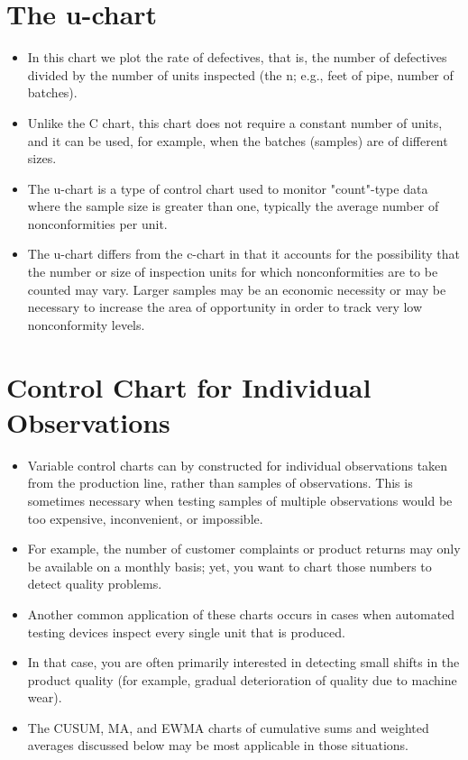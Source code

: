 \documentclass[a4paper,12pt]{article}
\begin{document}
\section{The u-chart}
\begin{itemize}
\item In this chart we plot the rate of defectives, that is, the number of defectives divided by the number of units inspected (the n; e.g., feet of pipe, number of batches). 
\item Unlike the C chart, this chart does not require a constant number of units, and it can be used, for example, when the batches (samples) are of different sizes.

\item The u-chart is a type of control chart used to monitor "count"-type data where the sample size is greater than one, typically the average number of nonconformities per unit.

\item The u-chart differs from the c-chart in that it accounts for the possibility that the number or size of inspection units for which nonconformities are to be counted may vary. Larger samples may be an economic necessity or may be necessary to increase the area of opportunity in order to track very low nonconformity levels.
\end{itemize}
\newpage
\section{Control Chart for Individual Observations}

\begin{itemize}
\item Variable control charts can by constructed for individual observations taken from the production line, rather than samples of observations. This is sometimes necessary when testing samples of multiple observations would be too expensive, inconvenient, or impossible. \item For example, the number of customer complaints or product returns may only be available on a monthly basis; yet, you want to chart those numbers to detect quality problems. \item Another common application of these charts occurs in cases when automated testing devices inspect every single unit that is produced. \item In that case, you are often primarily interested in detecting small shifts in the product quality (for example, gradual deterioration of quality due to machine wear). 
\item The CUSUM, MA, and EWMA charts of cumulative sums and weighted averages discussed below may be most applicable in those situations.
\end{itemize}
\end{document}
